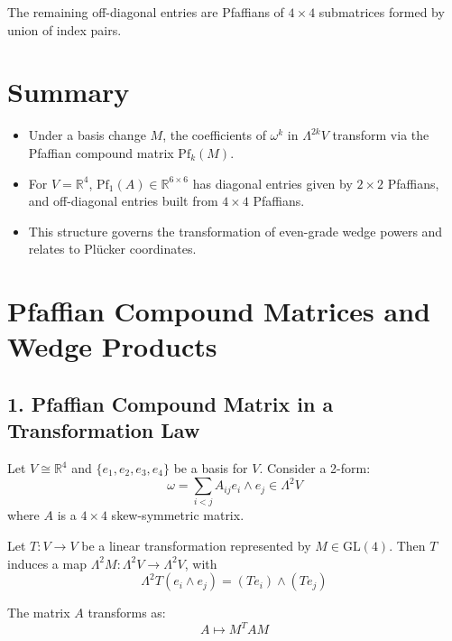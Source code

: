 \documentclass[aps,prd,onecolumn,notitlepage,nofootinbib]{revtex4-2}
\begin{document}
The remaining off-diagonal entries are Pfaffians of $4 \times 4$ submatrices
formed by union of index pairs.

\section*{Summary}

\begin{itemize}
\item Under a basis change $M$, the coefficients of $\omega ^{k}$ in $%
\Lambda ^{2k}V$ transform via the Pfaffian compound matrix $\mathrm{Pf}%
_{k}(M)$.

\item For $V=\mathbb{R}^{4}$, $\mathrm{Pf}_{1}(A)\in \mathbb{R}^{6\times 6}$
has diagonal entries given by $2\times 2$ Pfaffians, and off-diagonal
entries built from $4\times 4$ Pfaffians.

\item This structure governs the transformation of even-grade wedge powers
and relates to Pl\"{u}cker coordinates.
\end{itemize}

\section*{Pfaffian Compound Matrices and Wedge Products}

\subsection*{1. Pfaffian Compound Matrix in a Transformation Law}

Let $V \cong \mathbb{R}^4$ and $\{e_1, e_2, e_3, e_4\}$ be a basis for $V$.
Consider a 2-form: 
\begin{equation}
\omega = \sum_{i<j} A_{ij} e_i \wedge e_j \in \Lambda^2 V
\end{equation}
where $A$ is a $4 \times 4$ skew-symmetric matrix.

Let $T:V\rightarrow V$ be a linear transformation represented by $M\in 
\mathrm{GL}(4)$. Then $T$ induces a map $\Lambda ^{2}M:\Lambda
^{2}V\rightarrow \Lambda ^{2}V$, with 
\begin{equation}
\Lambda ^{2}T(e_{i}\wedge e_{j})=(Te_{i})\wedge (Te_{j})
\end{equation}

The matrix $A$ transforms as: 
\begin{equation}
A\mapsto M^{T}AM
\end{equation}
\end{document}

